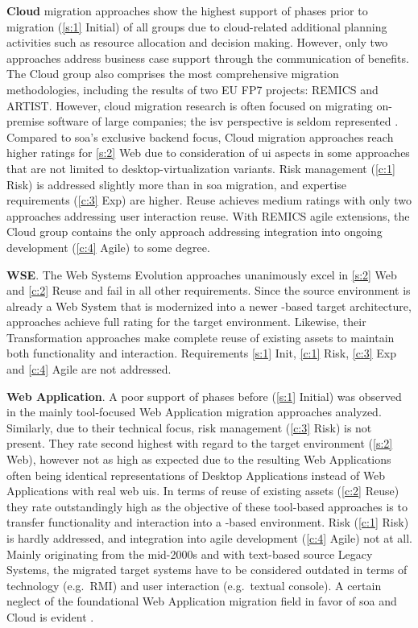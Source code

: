 \textbf{Cloud} migration approaches show the highest support of phases prior to migration (\cref{s:1} Initial) of all groups due to cloud-related additional planning activities such as resource allocation and decision making.
However, only two approaches address \gls{business case} support through the communication of benefits.
The Cloud group also comprises the most comprehensive migration methodologies, including the results of two EU FP7 projects: REMICS and ARTIST.
However, cloud migration research is often focused on migrating on-premise software of large companies; the \gls{isv} perspective is seldom represented \autocite{Fowley2017CloudSME}.
Compared to \gls{soa}'s exclusive backend focus, Cloud migration approaches reach higher ratings for \cref{s:2} Web due to consideration of \gls{ui} aspects in some approaches that are not limited to desktop-virtualization variants.
Risk management (\cref{c:1} Risk) is addressed slightly more than in \gls{soa} migration, and expertise requirements (\cref{c:3} Exp) are higher.
 Reuse achieves medium ratings with only two approaches addressing user interaction reuse.
With REMICS agile extensions, the Cloud group contains the only approach addressing integration into ongoing development (\cref{c:4} Agile) to some degree.

\textbf{WSE}. The \gls{Web Systems Evolution} approaches unanimously excel in \cref{s:2} Web and \cref{c:2} Reuse and fail in all other requirements.
Since the source environment is already a \gls{Web System} that is modernized into a newer -based target architecture,  approaches achieve full rating for the target environment.
Likewise, their \gls{Transformation} approaches make complete reuse of existing assets to maintain both functionality and interaction.
Requirements \cref{s:1} Init, \cref{c:1} Risk, \cref{c:3} Exp and \cref{c:4} Agile are not addressed.

\textbf{\gls{Web Application}}. A poor support of phases before  (\cref{s:1} Initial) was observed in the mainly tool-focused \gls{Web Application} migration approaches analyzed.
Similarly, due to their technical focus, \gls{risk management} (\cref{c:3} Risk) is not present.
They rate second highest with regard to the target environment (\cref{s:2} Web), however not as high as expected due to the resulting \glspl{Web Application} often being identical representations of \glspl{Desktop Application} instead of \glspl{Web Application} with real \gls{web} \glspl{ui}.
In terms of reuse of existing assets (\cref{c:2} Reuse) they rate outstandingly high as the objective of these tool-based approaches is to transfer functionality and interaction into a -based environment.
Risk (\cref{c:1} Risk) is hardly addressed, and integration into agile development (\cref{c:4} Agile) not at all.
Mainly originating from the mid-2000s and with text-based source \glspl{Legacy System}, the migrated \glspl{target system} have to be considered outdated in terms of technology (e.g.~RMI) and user interaction (e.g.~textual console).
A certain neglect of the foundational \gls{Web Application} migration field in favor of \gls{soa} and Cloud is evident  \autocite[cf.~also][]{Heil2017Survey}.

